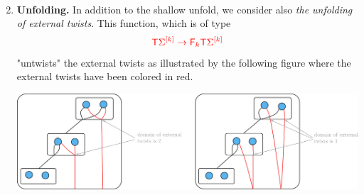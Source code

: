 \begin{enumerate}
$$\item \textbf{Unfolding.} In addition to the shallow unfold, 
 we consider also \emph{the unfolding of external twists}. This function, which is of type 
\begin{align*}
\ranked{\tmonad \mati k \Sigma \to \reduce k \tmonad \mati k \Sigma}
\end{align*}
"untwists" the external twists  as illustrated by the following figure where the external twists have been colored in red. 
\begin{center}
\includegraphics[scale=.4]{external-unfold.pdf}
\end{center}
\end{enumerate}


